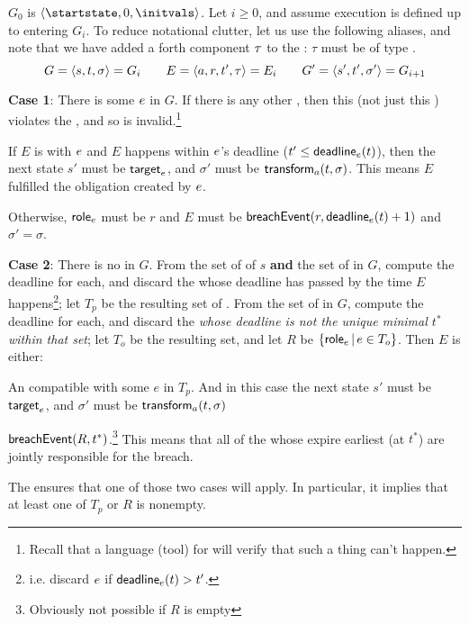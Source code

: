 \documentclass[12pt]{article}
\begin{document}
$G_0$ is $\tup{\startstate, 0, \initvals}$.
Let $i \geq 0$, and assume execution is defined up to entering $G_i$. To reduce notational clutter, let us use the following aliases, and note that we have added a forth component $\tau$ to the \Event: $\tau$ must be of type .
\[ G = \langle s,t,\sigma\rangle = G_i  \qquad E = \langle a,r,t',\tau\rangle =  E_i \qquad  G' = \langle s',t', \sigma'\rangle = G_{i+1}\]

{\bf Case 1}: There is some \enabled \mustntran $e$ in $G$. If there is any other \enabled \transition, then this \Contract (not just this \trace) violates the \uaocz, and so is invalid.\footnote{Recall that a language (tool) for \Contracts will verify that such a thing can't happen.}
\begin{PPI}
    \item If $E$ is \compatible with $e$ and $E$ happens within $e$'s deadline ($t' \leq \textsf{deadline}_{e}(t)$), then the next state $s'$ must be $\textsf{target}_{e}$, and $\sigma'$ must be $\textsf{transform}_{a}(t,\sigma)$. This means $E$ fulfilled the obligation created by $e$.
    \item Otherwise, $\textsf{role}_{e}$ must be $r$ and $E$ must be $\textsf{breachEvent}(r,\textsf{deadline}_{e}(t) + 1)$ and $\sigma' = \sigma$. %
\end{PPI}

{\bf Case 2}: There is no \enabled \mustntran in $G$. From the set of \enabled \mayntrans of $s$ {\bf and} the set of \enabled \rmustntrans in $G$, compute the deadline for each, and discard the \transitions whose deadline has passed by the time $E$ happens\footnote{i.e. discard $e$ if $\textsf{deadline}_{e}(t) > t'$.};  let $T_p$ be the resulting set of \transitions. From the set of \enabled \rmustntrans in $G$, compute the deadline for each, and discard the {\transitions} {\it whose deadline is not the unique minimal \TimeStamp $t^*$ within that set}; let $T_o$ be the resulting set, and let $R$ be $\{ \textsf{role}_{e} \, \vert \, e \in T_{o} \}$. Then $E$ is either:
\begin{PPI}
	\item An \Event compatible with some \transition $e$ in $T_p$. And in this case the next state $s'$ must be $\textsf{target}_{e}$, and $\sigma'$ must be $\textsf{transform}_{a}(t,\sigma)$
	\item $\textsf{breachEvent}(R,t^*)$.\footnote{Obviously not possible if $R$ is empty} This means that all of the \Roles whose \enabled \rmustntran expire earliest (at $t^*$) are jointly responsible for the breach.
\end{PPI}
The \bostgc ensures that one of those two cases will apply. In particular, it implies that at least one of $T_p$ or $R$ is nonempty.
\end{document}
